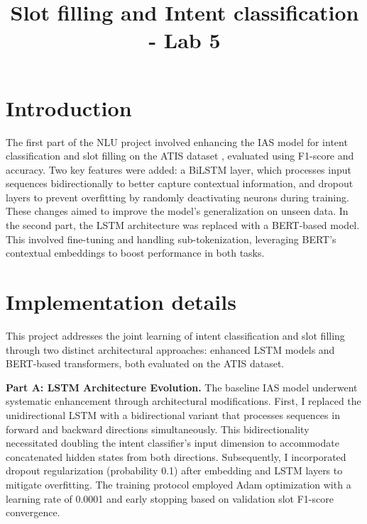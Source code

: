 \documentclass[a4paper]{article}
\title{Slot filling and Intent classification  - Lab 5}
\begin{document}
\maketitle
%
%
\section{Introduction}
The first part of the NLU project involved enhancing the IAS model for intent 
classification and slot filling on the ATIS dataset \cite{nlu-labs-unitn}, evaluated using F1-score and
 accuracy. Two key features were added: a BiLSTM layer, which processes input 
 sequences bidirectionally to better capture contextual information, and dropout 
 layers to prevent overfitting by randomly deactivating neurons during training.
 These changes aimed to improve the model’s generalization on unseen data. In the 
 second part, the LSTM architecture was replaced with a BERT-based model. This 
 involved fine-tuning and handling sub-tokenization, leveraging BERT’s contextual
 embeddings to boost performance in both tasks.
\section{Implementation details}
This project addresses the joint learning of intent classification and slot filling through two distinct architectural approaches: enhanced LSTM models and BERT-based transformers, both evaluated on the ATIS dataset.

\textbf{Part A: LSTM Architecture Evolution.} The baseline IAS model underwent systematic enhancement through architectural modifications. First, I replaced the unidirectional LSTM with a bidirectional variant that processes sequences in forward and backward directions simultaneously. This bidirectionality necessitated doubling the intent classifier's input dimension to accommodate concatenated hidden states from both directions. Subsequently, I incorporated dropout regularization (probability 0.1) after embedding and LSTM layers to mitigate overfitting. The training protocol employed Adam optimization with a learning rate of 0.0001 and early stopping based on validation slot F1-score convergence.
\end{document}
